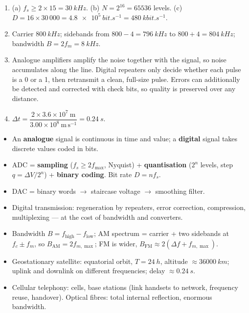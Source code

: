 \documentclass[11pt]{article}
\begin{document}
\begin{corrige}[Exercise 1]
\begin{enumerate}
\item (a) $f_s \geq 2 \times 15 = \SI{30}{kHz}$. (b) $N = 2^{16} = 65536$ levels. (c) $D = 16 \times 30\,000 = \SI{4.8e5}{bit.s^{-1}} = \SI{480}{kbit.s^{-1}}$.
\item Carrier $\SI{800}{kHz}$; sidebands from $800 - 4 = \SI{796}{kHz}$ to $800 + 4 = \SI{804}{kHz}$; bandwidth $B = 2 f_m = \SI{8}{kHz}$.
\item Analogue amplifiers amplify the noise together with the signal, so noise accumulates along the line. Digital repeaters only decide whether each pulse is a 0 or a 1, then retransmit a clean, full-size pulse. Errors can additionally be detected and corrected with check bits, so quality is preserved over any distance.
\item $\Delta t = \dfrac{2 \times 3.6\times10^{7}\ \mathrm{m}}{3.00\times10^{8}\ \mathrm{m\,s^{-1}}} = \SI{0.24}{s}$.
\end{enumerate}
\end{corrige}

\begin{aretenir}
\begin{itemize}
\item An \textbf{analogue} signal is continuous in time and value; a \textbf{digital} signal takes discrete values coded in bits.
\item ADC = \textbf{sampling} ($f_s \geq 2f_{\max}$, Nyquist) + \textbf{quantisation} ($2^n$ levels, step $q = \Delta V/2^n$) + \textbf{binary coding}. Bit rate $D = n f_s$.
\item DAC = binary words $\to$ staircase voltage $\to$ smoothing filter.
\item Digital transmission: regeneration by repeaters, error correction, compression, multiplexing --- at the cost of bandwidth and converters.
\item Bandwidth $B = f_{\text{high}} - f_{\text{low}}$; AM spectrum = carrier + two sidebands at $f_c \pm f_m$, so $B_{\text{AM}} = 2f_{m,\max}$; FM is wider, $B_{\text{FM}} \approx 2(\Delta f + f_{m,\max})$.
\item Geostationary satellite: equatorial orbit, $T = \SI{24}{h}$, altitude $\approx \SI{36000}{km}$; uplink and downlink on different frequencies; delay $\approx \SI{0.24}{s}$.
\item Cellular telephony: cells, base stations (link handsets to network, frequency reuse, handover). Optical fibres: total internal reflection, enormous bandwidth.
\end{itemize}
\end{aretenir}
\end{document}
